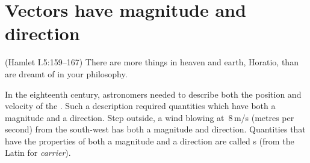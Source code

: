 
\section{Vectors have magnitude and direction}
\label{sec:vhmd}
{}

\begin{quoted}{(Hamlet I.5:159--167)}
There are more things in heaven and earth, Horatio, than are dreamt of in your philosophy.
\end{quoted}

In the eighteenth century, astronomers needed to describe both the position and velocity of the . 
Such a description required quantities which have both a magnitude and a direction.
Step outside, a wind blowing at~\(8\)\,m/s (metres per second) from the south-west has both a magnitude and direction.
Quantities that have the properties of both a magnitude and a 
direction are called s (from the Latin for \emph{carrier}).

